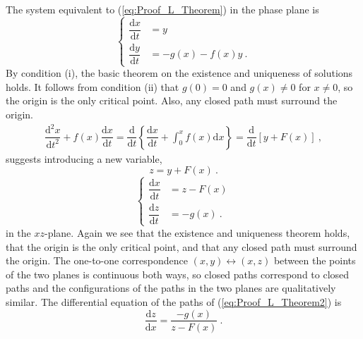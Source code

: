 \documentclass[12pt,a4paper]{article}
\newcommand{\dif}{\mathrm{d}}
\newcounter{theo}[section]\setcounter{theo}{0}
\begin{document}
The system equivalent to (\ref{eq:Proof_L_Theorem}) in the phase plane is
\begin{equation}
\left\{
\begin{aligned}
\dfrac{\dif x}{\dif t} & =  y \\
\dfrac{\dif y}{\dif t} & =  -g(x) -f(x) y ~.
\end{aligned}
\right.
\end{equation}
By condition (i), the basic theorem on the existence and uniqueness of solutions holds. It follows from condition (ii) that $g(0)= 0$ and $g(x) \neq 0$ for $x \neq 0$, so the origin is the only critical point. Also, any closed path must surround the origin. 
\begin{align*}
\dfrac{\dif^2 x}{\dif t^2} +f(x) \dfrac{\dif x}{\dif t} =  \dfrac{\dif}{\dif t} \left\{ \dfrac{\dif x}{\dif t} +\int_0^x f(x)\dif x \right\} = \dfrac{\dif}{\dif t} [ y +F(x) ] ~,
\end{align*}
suggests introducing a new variable,
\begin{equation}
z = y +F(x) ~.
\end{equation}
\begin{equation}
\left\{
\begin{aligned}
\dfrac{\dif x}{\dif t} & =  z -F(x) \\
\dfrac{\dif z}{\dif t} & =  -g(x) ~.
\end{aligned}
\right.
\label{eq:Proof_L_Theorem2}
\end{equation}
in the $xz$-plane. Again we see that the existence and uniqueness theorem holds, that the origin is the only critical point, and that any closed path must surround the origin. The one-to-one correspondence $(x,y) \leftrightarrow (x,z)$ between the points of the two planes is continuous both ways, so closed paths correspond to closed paths and the configurations of the paths in the two planes are qualitatively similar. The differential equation of the paths of (\ref{eq:Proof_L_Theorem2}) is
\begin{equation}
\dfrac{\dif z}{\dif x}  = \dfrac{-g(x)}{z -F(x)} ~.
\end{equation}
\end{document}
